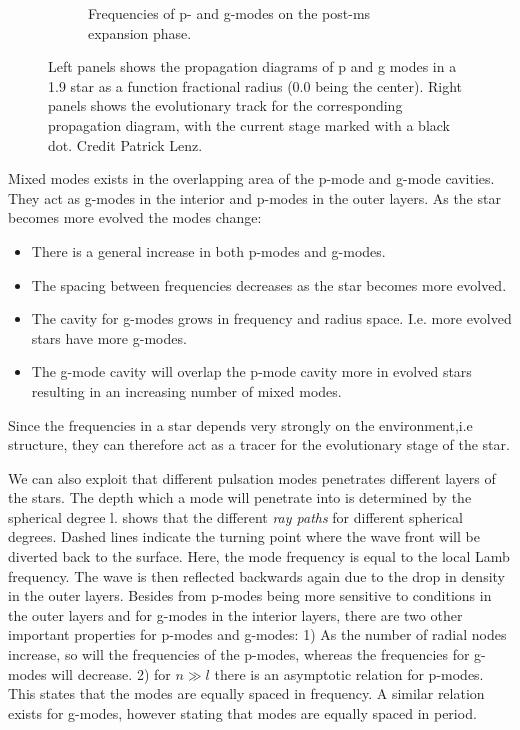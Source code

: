 \begin{figure}
\begin{subfigure}[b]{1\textwidth}
		\caption{Frequencies of p- and g-modes on the post-ms expansion phase. }
		\label{fig:five over x}
	\end{subfigure}
	\caption{ Left panels shows the propagation diagrams of p and g modes in a 1.9 \msun star as a function fractional radius (0.0 being the center). Right panels shows the evolutionary track for the corresponding propagation diagram, with the current stage marked with a black dot. Credit Patrick Lenz.  }
	\label{pandg}
\end{figure}


Mixed modes exists in the overlapping area of the p-mode and g-mode cavities. They act as g-modes in the interior and p-modes in the outer layers. As the star becomes more evolved the modes change:

\begin{itemize}
	\item There is a  general increase in both p-modes and g-modes. 
	\item The spacing between frequencies decreases as the star becomes more evolved.
	\item The cavity for g-modes grows in frequency and radius space. I.e. more evolved stars have more g-modes.
	\item The g-mode cavity will overlap the p-mode cavity more in evolved stars resulting in an increasing number of mixed modes.  
\end{itemize}

Since the frequencies in a star depends very strongly on the environment,i.e structure, they can therefore act as a tracer for the evolutionary stage of the star. 
 
We can also exploit that different pulsation modes penetrates different layers of the stars. The depth which a mode will penetrate into is determined by the spherical degree l.  shows that the different \textit{ray paths} for different spherical degrees. Dashed lines indicate the turning point where the wave front will be diverted back to the surface. Here, the mode frequency is equal to the local Lamb frequency. The wave is then reflected backwards again due to the drop in density in the outer layers. Besides from p-modes being more sensitive to conditions in the outer layers and for g-modes in the interior layers, there are two other important properties for p-modes and g-modes: 1) As the number of radial nodes increase, so will the frequencies of the p-modes, whereas the frequencies for g-modes will decrease. 2) for $n\gg l$ there is an asymptotic relation for p-modes. This states that the modes are equally spaced in frequency. A similar relation exists for g-modes, however stating that modes are equally spaced in period. 

